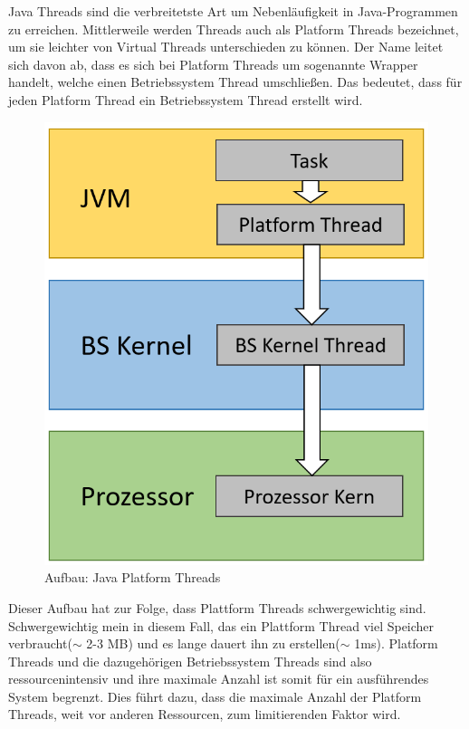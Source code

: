 \documentclass[fontsize=12pt,paper=a4,twoside=semi,parskip=half-,headsepline,headinclude]{scrreprt}
\begin{document}
Java Threads sind die verbreitetste Art um Nebenläufigkeit in Java-Programmen zu erreichen. Mittlerweile werden Threads auch als Platform Threads bezeichnet, um sie leichter von Virtual Threads unterschieden zu können. Der Name leitet sich davon ab, dass es sich bei Platform Threads um sogenannte Wrapper handelt, welche einen Betriebssystem Thread umschließen. Das bedeutet, dass für jeden Platform Thread ein Betriebssystem Thread erstellt wird.

\begin{figure}[h]
	\centering
	\includegraphics[scale=0.5]{figures/PlatformThreads.png}
	\caption{Aufbau: Java Platform Threads}
	\label{fig:PlatformThreads}
\end{figure}

Dieser Aufbau hat zur Folge, dass Plattform Threads schwergewichtig sind. Schwergewichtig mein in diesem Fall, das ein Plattform Thread viel Speicher verbraucht($\sim$ 2-3 MB) und es lange dauert ihn zu erstellen($\sim$ 1ms). Platform Threads und die dazugehörigen Betriebssystem Threads sind also ressourcenintensiv und ihre maximale Anzahl ist somit für ein ausführendes System begrenzt. Dies führt dazu, dass die maximale Anzahl der Platform Threads, weit vor anderen Ressourcen, zum limitierenden Faktor wird. 
\end{document}
